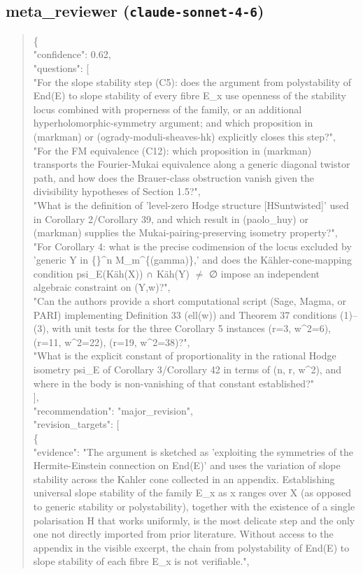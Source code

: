 \documentclass[11pt]{article}
\begin{document}
\subsection*{meta\_reviewer (\texttt{claude-sonnet-4-6})}
\begin{quote}\small\ttfamily\raggedright
\{\\
  "confidence": 0.62,\\
  "questions": [\\
    "For the slope stability step (C5): does the argument from polystability of End(E) to slope stability of every fibre E\_x use openness of the stability locus combined with properness of the family, or an additional hyperholomorphic-symmetry argument; and which proposition in (markman) or (ogrady-moduli-sheaves-hk) explicitly closes this step?",\\
    "For the FM equivalence (C12): which proposition in (markman) transports the Fourier-Mukai equivalence along a generic diagonal twistor path, and how does the Brauer-class obstruction vanish given the divisibility hypotheses of Section 1.5?",\\
    "What is the definition of 'level-zero Hodge structure [HSuntwisted]' used in Corollary 2/Corollary 39, and which result in (paolo\_huy) or (markman) supplies the Mukai-pairing-preserving isometry property?",\\
    "For Corollary 4: what is the precise codimension of the locus excluded by 'generic Y in \{\}\^{}n M\_m\^{}\{(gamma)\},' and does the Kähler-cone-mapping condition psi\_E(Käh(X)) ∩ Käh(Y) \ensuremath{\ne} ∅ impose an independent algebraic constraint on (Y,w)?",\\
    "Can the authors provide a short computational script (Sage, Magma, or PARI) implementing Definition 33 (ell(w)) and Theorem 37 conditions (1)--(3), with unit tests for the three Corollary 5 instances (r=3, w\^{}2=6), (r=11, w\^{}2=22), (r=19, w\^{}2=38)?",\\
    "What is the explicit constant of proportionality in the rational Hodge isometry psi\_E of Corollary 3/Corollary 42 in terms of (n, r, w\^{}2), and where in the body is non-vanishing of that constant established?"\\
  ],\\
  "recommendation": "major\_revision",\\
  "revision\_targets": [\\
    \{\\
      "evidence": "The argument is sketched as 'exploiting the symmetries of the Hermite-Einstein connection on End(E)' and uses the variation of slope stability across the Kahler cone collected in an appendix. Establishing universal slope stability of the family E\_x as x ranges over X (as opposed to generic stability or polystability), together with the existence of a single polarisation H that works uniformly, is the most delicate step and the only one not directly imported from prior literature. Without access to the appendix in the visible excerpt, the chain from polystability of End(E) to slope stability of each fibre E\_x is not verifiable.",\\

\end{quote}
\end{document}

